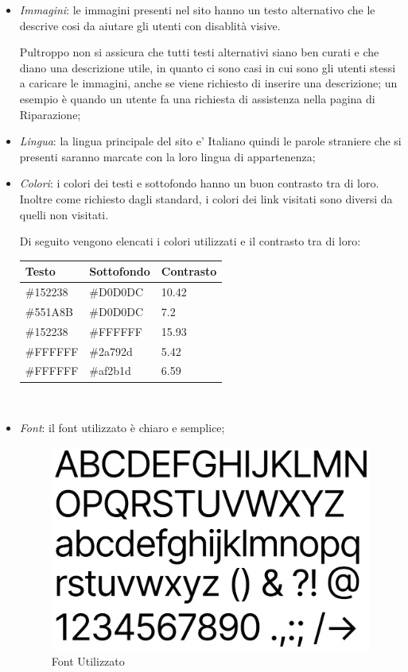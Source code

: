\begin{itemize}
	\item \textit{Immagini}: le immagini presenti nel sito hanno un testo alternativo che le descrive
	cosi da aiutare gli utenti con disablità visive.

	Pultroppo non si assicura che tutti testi alternativi
	siano ben curati e che diano una descrizione utile, in quanto ci sono casi in cui sono 
	gli utenti stessi a caricare le immagini, anche se viene richiesto di inserire una descrizione;
	un esempio è quando un utente fa una richiesta di assistenza nella pagina di Riparazione;
	\item \textit{Lingua}: la lingua principale del sito e' Italiano quindi le parole straniere che 
	si presenti saranno marcate con la loro lingua di appartenenza;
	\item \textit{Colori}: i colori dei testi e sottofondo hanno un buon contrasto tra di loro.
	Inoltre come richiesto dagli standard, i colori dei link visitati sono diversi da quelli non visitati.
	
	Di seguito vengono elencati i colori utilizzati e il contrasto tra di loro:

	\begin{tabular}{| C{4.5cm} | C{4.5cm} | C{4.5cm} |}
		\hline
		\textbf{Testo} & \textbf{Sottofondo} & \textbf{Contrasto}\\
		\hline
		\#152238 & \#D0D0DC & 10.42\\
		\#551A8B & \#D0D0DC & 7.2\\
		\#152238 & \#FFFFFF & 15.93\\
		\#FFFFFF & \#2a792d & 5.42\\
		\#FFFFFF & \#af2b1d & 6.59\\
		\hline
	\end{tabular}\\
	
	\item \textit{Font}: il font utilizzato è chiaro e semplice;

	\begin{figure}[H]
	\centering
	\includegraphics[scale=0.4]{res/font.png}
	\caption{Font Utilizzato}
	\end{figure}


\end{itemize}
